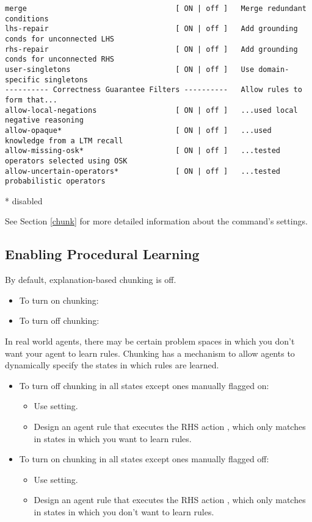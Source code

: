 {\begin{verbatim}
merge                                  [ ON | off ]   Merge redundant conditions
lhs-repair                             [ ON | off ]   Add grounding conds for unconnected LHS
rhs-repair                             [ ON | off ]   Add grounding conds for unconnected RHS
user-singletons                        [ ON | off ]   Use domain-specific singletons
---------- Correctness Guarantee Filters ----------   Allow rules to form that...
allow-local-negations                  [ ON | off ]   ...used local negative reasoning
allow-opaque*                          [ ON | off ]   ...used knowledge from a LTM recall
allow-missing-osk*                     [ ON | off ]   ...tested operators selected using OSK
allow-uncertain-operators*             [ ON | off ]   ...tested probabilistic operators
\end{verbatim}
* disabled
}

See Section \ref{chunk} for more detailed information about the  command's settings.

\subsection{Enabling Procedural Learning}
\label{CHUNKING-usage-enable}

By default, explanation-based chunking is off.

\begin{itemize}
	\item To turn on chunking: 
	\item To turn off chunking: 
\end{itemize}

In real world agents, there may be certain problem spaces in which you don't want your agent to learn rules.  Chunking has a mechanism to allow agents to dynamically specify the states in which rules are learned. 

\begin{itemize}
	\item To turn off chunking in all states except ones manually flagged on: 
	\begin{itemize}
		\item Use  setting.
		\item Design an agent rule that executes the RHS action , which only matches in states in which you want to learn rules.
	\end{itemize}
	\item To turn on chunking in all states except ones manually flagged off: 
	\begin{itemize}
		\item Use  setting.
		\item Design an agent rule that executes the RHS action , which only matches in states in which you don't want to learn rules.
	\end{itemize}
\end{itemize}

